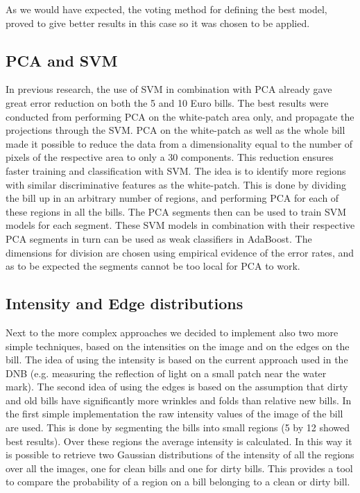 \documentclass[11pt,twocolumn]{article}
\begin{document}
			As we would have expected, the voting method for defining the best model, proved to give better results in this case so it was chosen to be applied.

		\subsection{PCA and SVM}\label{sec:PCA}
			In previous research, the use of SVM in combination with PCA already gave great error reduction on both the 5 and 10 Euro bills. The best results were conducted from performing PCA on the white-patch area only, and propagate the projections through the SVM. PCA on the white-patch as well as the whole bill made it possible to reduce the data from a dimensionality equal to the number of pixels of the respective area to only a 30 components. This reduction ensures faster training and classification with SVM. The idea is to identify more regions with similar discriminative features as the white-patch. This is done by dividing the bill up in an arbitrary number of regions, and performing PCA for each of these regions in all the bills. The PCA segments then can be used to train SVM models for each segment. These SVM models in combination with their respective PCA segments in turn can be used as weak classifiers in AdaBoost. The dimensions for division are chosen using empirical evidence of the error rates, and as to be expected the segments cannot be too local for PCA to work.

		\subsection{Intensity and Edge distributions}\label{sec:Intensity_Edge}
			Next to the more complex approaches we decided to implement	also two more simple techniques, based on the intensities on the image and on the edges on the bill. The idea of using the intensity is based on	the current approach used in the DNB (e.g. measuring the reflection of light on a small patch near the water mark). The second idea of using the edges is based on the assumption that dirty and old	bills have significantly more wrinkles and folds than relative new bills. In the first simple implementation the raw intensity values of the image of the bill are used. This is done by segmenting the bills into small regions (5 by 12 showed best results). Over these regions the average intensity is calculated. In this way it is possible to retrieve two Gaussian distributions	of the intensity of all the regions over all the images, one for clean bills and one for dirty bills. This provides a tool to compare the probability of a region on a bill belonging to a clean or dirty bill.
			
\end{document}
